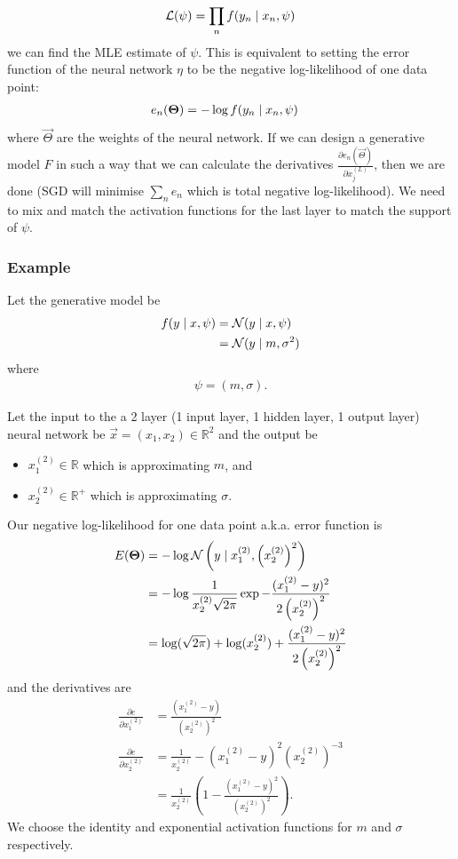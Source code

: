 \begin{align}
    \mathcal L(\psi) = \prod_n f(y_n \mid x_n, \psi)
\end{align}
we can find the MLE estimate of $\psi$. This is equivalent to setting the error function of the neural network $\eta$ to be the negative log-likelihood of one data point:
\begin{align}
    e_n(\boldsymbol{\mathbf{\Theta}})    &= -\log f(y_n \mid x_n, \psi)
\end{align}
where $\vec \Theta$ are the weights of the neural network. If we can design a generative model $F$ in such a way that we can calculate the derivatives $\frac{\partial e_n(\vec \Theta)}{\partial x_j^{(L)}}$, then we are done (SGD will minimise $\sum_n e_n$ which is total negative log-likelihood). We need to mix and match the activation functions for the last layer to match the support of $\psi$.

\subsubsection{Example}
Let the generative model be
\begin{align}
    f(y \mid x, \psi) &= \operatorname{\mathcal N}(y \mid x, \psi) \\
                        &= \operatorname{\mathcal N}(y \mid m, \sigma^2)
\end{align}
where
\begin{align}
    \psi = (m, \sigma).
\end{align}

Let the input to the a 2 layer (1 input layer, 1 hidden layer, 1 output layer) neural network be $\vec x = (x_1, x_2) \in \mathbb R^2$ and the output be
\begin{itemize}
    \item $x_1^{(2)} \in \mathbb R$ which is approximating $m$, and
    \item $x_2^{(2)} \in \mathbb R^+$ which is approximating $\sigma$.
\end{itemize}

Our negative log-likelihood for one data point a.k.a. error function is
\begin{align}
    E(\boldsymbol{\mathbf{\Theta}})  &= -\log\operatorname{\mathcal N}\left(y \mid x_1^{(2)}, \left(x_2^{(2)}\right)^2\right) \\
                    &= -\log \frac{1}{x_2^{(2)} \sqrt{2\pi}} \exp{-\frac{(x_1^{(2)} - y)^2}{2\left(x_2^{(2)}\right)^2}} \\
                    &= \log(\sqrt{2\pi}) + \log(x_2^{(2)}) + \frac{(x_1^{(2)} - y)^2}{2\left(x_2^{(2)}\right)^2}
\end{align}
and the derivatives are
\begin{align}
    \frac{\partial e}{\partial x_1^{(2)}}  &= \frac{\left(x_1^{(2)} - y\right)}{\left(x_2^{(2)}\right)^2} \\
    \frac{\partial e}{\partial x_2^{(2)}}  &= \frac{1}{x_2^{(2)}} - \left(x_1^{(2)} - y\right)^2\left(x_2^{(2)}\right)^{-3} \\
                                    &= \frac{1}{x_2^{(2)}}\left(1 - \frac{(x_1^{(2)} - y)^2}{\left(x_2^{(2)}\right)^2}\right).
\end{align}
We choose the identity and exponential activation functions for $m$ and $\sigma$ respectively.